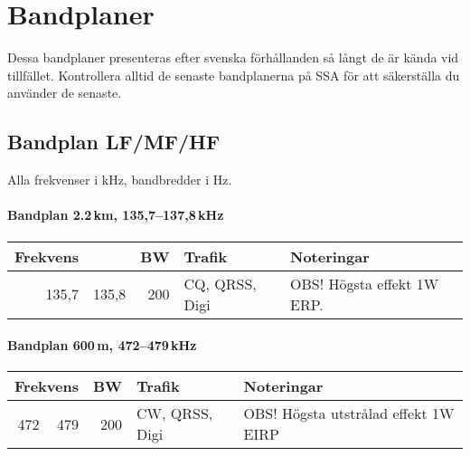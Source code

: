 \onecolumn

\chapter{Bandplaner}
\label{bandplaner2}

\noindent Dessa bandplaner presenteras efter svenska förhållanden så långt de är kända vid tillfället. Kontrollera alltid de senaste bandplanerna på SSA för att säkerställa du använder de senaste.

\section{Bandplan LF/MF/HF}

Alla frekvenser i kHz, bandbredder i Hz.

\subsubsection{Bandplan 2.2\,km, 135,7--137,8\,kHz}
\begin{tabular}{rrrll}
\textbf{Frekvens} &  & \textbf{BW} & \textbf{Trafik} & \textbf{Noteringar} \\ \hline
135,7 & 135,8 & 200 & CQ, QRSS, Digi & OBS! Högsta effekt 1W ERP. \\ \hline
\end{tabular}

\subsubsection{Bandplan 600\,m, 472--479\,kHz}
\begin{tabular}{rrrll}
\multicolumn{2}{c}{\textbf{Frekvens}} & \textbf{BW} & \textbf{Trafik} & \textbf{Noteringar} \\ \hline
472 & 479 & 200 & CW, QRSS, Digi & OBS! Högsta utstrålad effekt 1W EIRP \\ \hline
\end{tabular}

